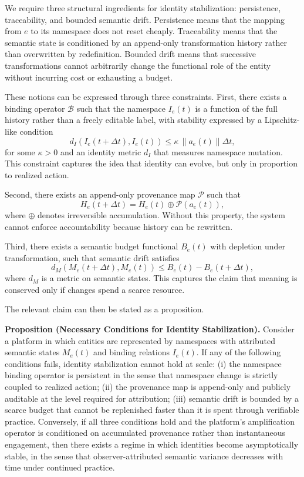 \documentclass[11pt,oneside]{article}
\begin{document}
We require three structural ingredients for identity stabilization: persistence, traceability, and bounded semantic drift. Persistence means that the mapping from $e$ to its namespace does not reset cheaply. Traceability means that the semantic state is conditioned by an append-only transformation history rather than overwritten by redefinition. Bounded drift means that successive transformations cannot arbitrarily change the functional role of the entity without incurring cost or exhausting a budget.

These notions can be expressed through three constraints. First, there exists a binding operator $\mathcal{B}$ such that the namespace $I_e(t)$ is a function of the full history rather than a freely editable label, with stability expressed by a Lipschitz-like condition
\[
d_I\!\left(I_e(t+\Delta t), I_e(t)\right) \leq \kappa\, \|a_e(t)\| \Delta t,
\]
for some $\kappa>0$ and an identity metric $d_I$ that measures namespace mutation. This constraint captures the idea that identity can evolve, but only in proportion to realized action.

Second, there exists an append-only provenance map $\mathcal{P}$ such that
\[
H_e(t+\Delta t) = H_e(t) \oplus \mathcal{P}\!\left(a_e(t)\right),
\]
where $\oplus$ denotes irreversible accumulation. Without this property, the system cannot enforce accountability because history can be rewritten.

Third, there exists a semantic budget functional $B_e(t)$ with depletion under transformation, such that semantic drift satisfies
\[
d_M\!\left(M_e(t+\Delta t), M_e(t)\right) \leq B_e(t) - B_e(t+\Delta t),
\]
where $d_M$ is a metric on semantic states. This captures the claim that meaning is conserved only if changes spend a scarce resource.

The relevant claim can then be stated as a proposition.

\textbf{Proposition (Necessary Conditions for Identity Stabilization).} Consider a platform in which entities are represented by namespaces with attributed semantic states $M_e(t)$ and binding relations $I_e(t)$. If any of the following conditions fails, identity stabilization cannot hold at scale: (i) the namespace binding operator is persistent in the sense that namespace change is strictly coupled to realized action; (ii) the provenance map is append-only and publicly auditable at the level required for attribution; (iii) semantic drift is bounded by a scarce budget that cannot be replenished faster than it is spent through verifiable practice. Conversely, if all three conditions hold and the platform’s amplification operator is conditioned on accumulated provenance rather than instantaneous engagement, then there exists a regime in which identities become asymptotically stable, in the sense that observer-attributed semantic variance decreases with time under continued practice.
\end{document}
